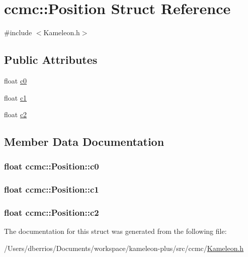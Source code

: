 \hypertarget{structccmc_1_1_position}{\section{ccmc\-:\-:Position Struct Reference}
\label{structccmc_1_1_position}
}


{\ttfamily \#include $<$Kameleon.\-h$>$}

\subsection*{Public Attributes}
\begin{DoxyCompactItemize}
\item 
float \hyperlink{structccmc_1_1_position_a0b395e8f55e11c77b1246aaaad583640}{c0}
\item 
float \hyperlink{structccmc_1_1_position_a3c33c74bbff85c9476f5107b53d26012}{c1}
\item 
float \hyperlink{structccmc_1_1_position_ae38598bba39f42e5dbade94f209b58ca}{c2}
\end{DoxyCompactItemize}


\subsection{Member Data Documentation}
\hypertarget{structccmc_1_1_position_a0b395e8f55e11c77b1246aaaad583640}{
\subsubsection[{c0}]{\setlength{\rightskip}{0pt plus 5cm}float ccmc\-::\-Position\-::c0}}\label{structccmc_1_1_position_a0b395e8f55e11c77b1246aaaad583640}
\hypertarget{structccmc_1_1_position_a3c33c74bbff85c9476f5107b53d26012}{
\subsubsection[{c1}]{\setlength{\rightskip}{0pt plus 5cm}float ccmc\-::\-Position\-::c1}}\label{structccmc_1_1_position_a3c33c74bbff85c9476f5107b53d26012}
\hypertarget{structccmc_1_1_position_ae38598bba39f42e5dbade94f209b58ca}{
\subsubsection[{c2}]{\setlength{\rightskip}{0pt plus 5cm}float ccmc\-::\-Position\-::c2}}\label{structccmc_1_1_position_ae38598bba39f42e5dbade94f209b58ca}


The documentation for this struct was generated from the following file\-:\begin{DoxyCompactItemize}
\item 
/\-Users/dberrios/\-Documents/workspace/kameleon-\/plus/src/ccmc/\hyperlink{_kameleon_8h}{Kameleon.\-h}\end{DoxyCompactItemize}
